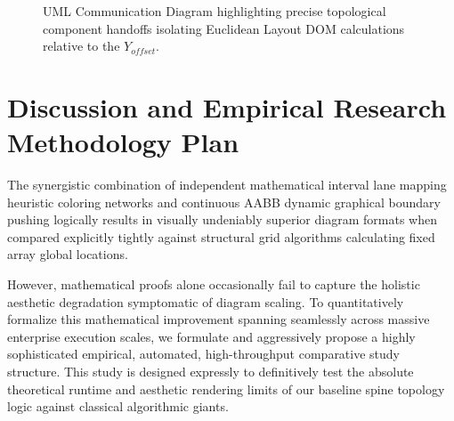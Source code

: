 \documentclass[fleqn,10pt]{wlscirep}
\begin{document}
\begin{figure}[ht]
\centering
{}
\caption{UML Communication Diagram highlighting precise topological component handoffs isolating Euclidean Layout DOM calculations relative to the $Y_{offset}$.}
\label{fig:comm_class}
\end{figure}\section*{Discussion and Empirical Research Methodology Plan}
The synergistic combination of independent mathematical interval lane mapping heuristic coloring networks and continuous AABB dynamic graphical boundary pushing logically results in visually undeniably superior diagram formats when compared explicitly tightly against structural grid algorithms calculating fixed array global locations. 

However, mathematical proofs alone occasionally fail to capture the holistic aesthetic degradation symptomatic of diagram scaling. To quantitatively formalize this mathematical improvement spanning seamlessly across massive enterprise execution scales, we formulate and aggressively propose a highly sophisticated empirical, automated, high-throughput comparative study structure. This study is designed expressly to definitively test the absolute theoretical runtime and aesthetic rendering limits of our baseline spine topology logic against classical algorithmic giants.
\end{document}
